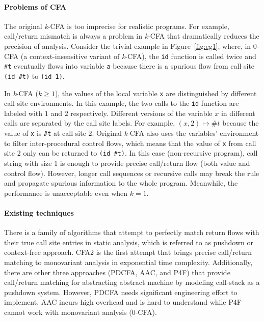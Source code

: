 \documentclass{article}
\begin{document}
\paragraph{Problems of CFA}
The original \textit{k}-CFA is too imprecise for realistic programs.
For example, call/return mismatch is always a problem in \textit{k}-CFA that dramatically reduces the precision of analysis.
Consider the trivial example in Figure~\ref{fig:eg1}, where, in 0-CFA (a context-insensitive variant of \textit{k}-CFA), the \verb|id| function is called twice and \verb|#t| eventually flows into variable \verb|a| because there is a spurious flow from call site
\verb|(id #t)| to \verb|(id 1)|.

In \textit{k}-CFA ($k \geq 1$), the values of the local variable \verb|x| are distinguished by different call site environments.
In this example, the two calls to the \verb|id| function are labeled with $1$ and $2$ respectively.
Different versions of the variable $x$ in different calls are separated by the call site labels.
For example, $(x, 2) \mapsto \#t$ because the value of \verb|x| is \verb|#t| at call site 2.
Original \textit{k}-CFA also uses the variables' environment to filter inter-procedural control flows,
which means that the value of \verb|x| from call site 2 only can be returned to \verb|(id #t)|.
In this case (non-recursive program), call string with size 1 is enough to provide precise call/return flow
(both value and control flow). %
However, longer call sequences or recursive calls may break the rule and propagate spurious information to the whole program.
Meanwhile, the performance is unacceptable even when $k = 1$.

\paragraph{Existing techniques}
There is a family of algorithms that attempt to perfectly match return flows with their true call site entries in static analysis, which is referred to as pushdown or context-free approach.
CFA2 is the first attempt that brings precise call/return matching to monovariant analysis in exponential time complexity.
Additionally, there are other three approaches (PDCFA, AAC, and P4F) that provide call/return matching for abstracting abstract machine by modeling call-stack as a pushdown system.
However, PDCFA needs significant engineering effort to implement.
AAC incurs high overhead and is hard to understand while P4F cannot work with monovariant analysis (0-CFA).
\end{document}
